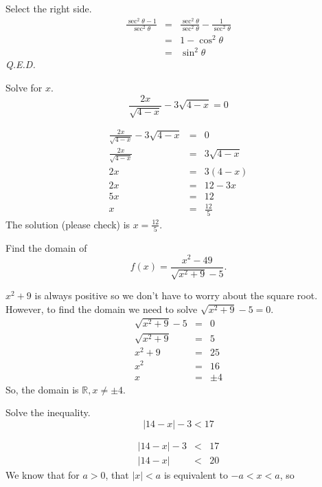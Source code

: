 \documentclass[12pt,addpoints, answers, fleqn]{exam}
\begin{document}
\begin{questions}
\begin{solution}
Select the right side.
\begin{eqnarray*}
\frac{\sec^2 \theta - 1}{\sec^2 \theta} &=& \frac{\sec^2 \theta}{\sec^2 \theta} - \frac{1}{\sec^2 \theta}\\
&=& 1 - \cos^2 \theta\\
&=& \sin^2 \theta
\end{eqnarray*}
\emph{Q.E.D.}
\end{solution}
\question Solve for $x$.
\[
\frac{2x}{\sqrt{4-x}} -3\sqrt{4-x}= 0
\]
\begin{solution}
\begin{eqnarray*}
\frac{2x}{\sqrt{4-x}} -3\sqrt{4-x} &=& 0\\
\frac{2x}{\sqrt{4-x}}  &=& 3\sqrt{4-x}\\
2x &=& 3\left(4-x\right)\\
2x &=& 12-3x\\
5x &=& 12\\
x &=& \frac{12}{5}
\end{eqnarray*}
The solution (please check) is $\boxed{x=\frac{12}{5}}$.
\end{solution}
\question Find the domain of
\[
f\left(x \right) = \frac{x^2 - 49}{\sqrt{x^2 + 9} - 5}.
\]
\begin{solution} $x^2 + 9$ is always positive so we don't have to worry about the square root. However, to find the domain we need to solve $\sqrt{x^2 + 9} - 5 =0$.
\begin{eqnarray*}
\sqrt{x^2 + 9} - 5 &=& 0\\
\sqrt{x^2 + 9} &=& 5\\
x^2 + 9 &=& 25\\
x^2  &=& 16\\
x  &=& \pm 4
\end{eqnarray*}
So, the domain is $\boxed{\mathbb{R}, x \neq \pm 4}$.
\end{solution}
\question Solve the inequality.
\[
\left|  14 - x \right| - 3 < 17
\]
\begin{solution}
\begin{eqnarray*}
\left|  14 - x \right| - 3 &<& 17\\
\left|  14 - x \right|  &<& 20
\end{eqnarray*}
We know that for $a>0$, that $\left|  x  \right| < a$ is equivalent to $-a < x < a$, so
\begin{eqnarray*}

\end{eqnarray*}
\end{solution}
\end{questions}
\end{document}
